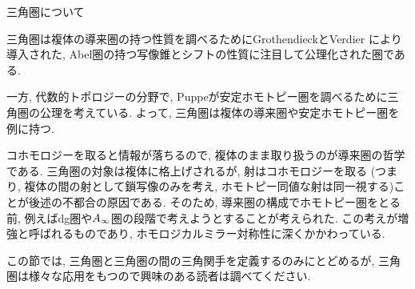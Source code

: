 \documentclass[aspectratio=169, dvipdfmx, 8pt, notheorems, uplatex]{beamer}
\begin{document}
\begin{frame}{三角圏について}
  \begin{block}{}
    三角圏は複体の導来圏の持つ性質を調べるためにGrothendieckとVerdier \cite{Ver96}により導入された, Abel圏の持つ写像錐とシフトの性質に注目して公理化された圏である.  \bigskip

    一方, 代数的トポロジーの分野で, Puppeが安定ホモトピー圏を調べるために三角圏の公理を考えている.
    よって, 三角圏は複体の導来圏や安定ホモトピー圏を例に持つ. \bigskip

    コホモロジーを取ると情報が落ちるので, 複体のまま取り扱うのが導来圏の哲学である. 
    三角圏の対象は複体に格上げされるが, 射はコホモロジーを取る (つまり, 複体の間の射として鎖写像のみを考え, ホモトピー同値な射は同一視する)ことが後述の不都合の原因である. 
    そのため, 導来圏の構成でホモトピー圏をとる前, 例えばdg圏や$A_\infty$圏の段階で考えようとすることが考えられた. 
    この考えが増強と呼ばれるものであり, ホモロジカルミラー対称性に深くかかわっている. \bigskip

    この節では, 三角圏と三角圏の間の三角関手を定義するのみにとどめるが, 三角圏は様々な応用をもつので興味のある読者は調べてください. \cite{Nak15,Nee01, Nic17} 
  \end{block}
\end{frame}
\end{document}
